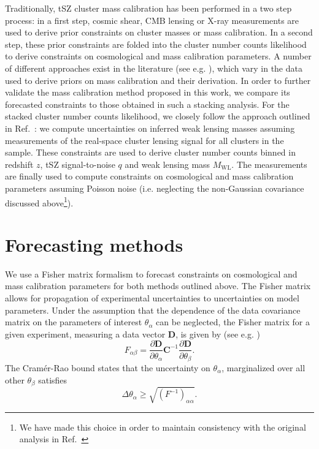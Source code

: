 \documentclass[%
 reprint,
nofootinbib,
 amsmath,amssymb,
 aps,
]{revtex4-1}
\begin{document}
Traditionally, tSZ cluster mass calibration has been performed in a two step process: in a first step, cosmic shear, CMB lensing or X-ray measurements are used to derive prior constraints on cluster masses or mass calibration. In a second step, these prior constraints are folded into the cluster number counts likelihood to derive constraints on cosmological and mass calibration parameters. A number of different approaches exist in the literature (see e.g. \cite{Sehgal:2011, Bocquet:2015, Haan:2016, Alonso:2016, Louis:2017}), which vary in the data used to derive priors on mass calibration and their derivation. In order to further validate the mass calibration method proposed in this work, we compare its forecasted constraints to those obtained in such a stacking analysis. For the stacked cluster number counts likelihood, we closely follow the approach outlined in Ref.~\cite{Madhavacheril:2017}: we compute uncertainties on inferred weak lensing masses assuming measurements of the real-space cluster lensing signal for all clusters in the sample. These constraints are used to derive cluster number counts binned in redshift $z$, tSZ signal-to-noise $q$ and weak lensing mass $M_{\mathrm{WL}}$. The measurements are finally used to compute constraints on cosmological and mass calibration parameters assuming Poisson noise (i.e. neglecting the non-Gaussian covariance discussed above\footnote{We have made this choice in order to maintain consistency with the original analysis in Ref.~\cite{Madhavacheril:2017}}).

\section{Forecasting methods}\label{sec:forecasts}

We use a Fisher matrix formalism to forecast constraints on cosmological and mass calibration parameters for both methods outlined above. The Fisher matrix allows for propagation of experimental uncertainties to uncertainties on model parameters. Under the assumption that the dependence of the data covariance matrix on the parameters of interest $\theta_{\alpha}$ can be neglected, the Fisher matrix for a given experiment, measuring a data vector $\mathbf{D}$, is given by (see e.g. \cite{Fisher:1935, Kendall:1979, Tegmark:1997})
\begin{equation}
F_{\alpha \beta} = \frac{\partial \mathbf{D}}{\partial \theta_{\alpha}}\mathbf{C}^{-1}\frac{\partial \mathbf{D}}{\partial \theta_{\beta}}.
\end{equation}
The Cram\'er-Rao bound states that the uncertainty on $\theta_{\alpha}$, marginalized over all other $\theta_{\beta}$ satisfies
\begin{equation}
\Delta \theta_{\alpha} \geq \sqrt{(F^{-1})_{\alpha \alpha}}.
\end{equation}
\end{document}
